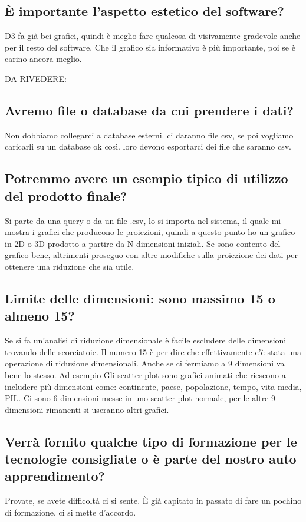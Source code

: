 \documentclass{article}
\begin{document}
    \subsection{È importante l'aspetto estetico del software?}
    \label{sub:domanda_11}
    D3 fa già bei grafici, quindi è meglio fare qualcosa di visivamente gradevole anche per il resto del software. Che il grafico sia informativo è più importante, poi se è carino ancora meglio.


    DA RIVEDERE:
    \subsection{Avremo file o database da cui prendere i dati?}
    \label{sub:domanda_12}
    Non dobbiamo collegarci a database esterni. ci daranno file csv, se poi vogliamo caricarli su un database ok così. loro devono esportarci dei file che saranno csv.

    \subsection{Potremmo avere un esempio tipico di utilizzo del prodotto finale?}
    \label{sub:domanda_13}
    Si parte da una query o da un file .csv, lo si importa nel sistema, il quale mi mostra i grafici che producono le proiezioni, quindi a questo punto ho un grafico in 2D o 3D prodotto a partire da N dimensioni iniziali. Se sono contento del grafico bene, altrimenti proseguo con altre modifiche sulla proiezione dei dati per ottenere una riduzione che sia utile.

    \subsection{Limite delle dimensioni: sono massimo 15 o almeno 15?}
    \label{sub:domanda_14}
    Se si fa un'analisi di riduzione dimensionale è facile escludere delle dimensioni trovando delle scorciatoie. Il numero 15 è per dire che effettivamente c'è stata una operazione di riduzione dimensionali. Anche se ci fermiamo a 9 dimensioni va bene lo stesso.
    Ad esempio
    Gli scatter plot sono grafici animati che riescono a includere più dimensioni come: continente, paese, popolazione, tempo, vita media, PIL. Ci sono 6 dimensioni messe in uno scatter plot normale, per le altre 9 dimensioni rimanenti si useranno altri grafici.

    \subsection{Verrà fornito qualche tipo di formazione per le tecnologie consigliate o è parte del nostro auto apprendimento?}
    \label{sub:domanda_15}
    Provate, se avete difficoltà ci si sente. È già capitato in passato di fare un pochino di formazione, ci si mette d'accordo.
\end{document}
